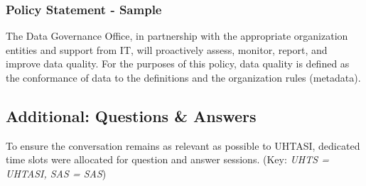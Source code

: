 \subsubsection{Policy Statement - Sample}
The Data Governance Office, in partnership with the appropriate organization entities and support from IT, will proactively assess, monitor, report, and improve data quality. For the purposes of this policy, data quality is defined as the conformance of data to the definitions and the organization rules (metadata).

\subsection{Additional: Questions \& Answers}

To ensure the conversation remains as relevant as possible to UHTASI, dedicated time slots were allocated for question and answer sessions. (Key: \textit{UHTS = UHTASI, SAS = SAS})

